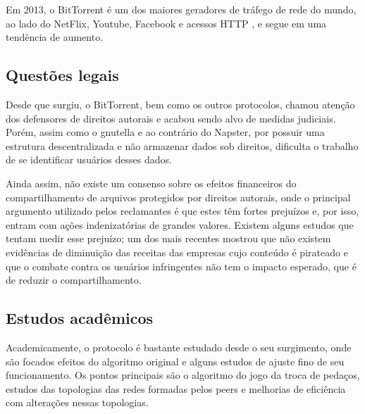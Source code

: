 Em 2013, o BitTorrent é um dos maiores geradores de tráfego de rede do mundo, ao lado
do NetFlix, Youtube, Facebook e acessos HTTP \cite{report:internet-usage-2013}, e segue
em uma tendência de aumento.

\subsection{Questões legais}

Desde que surgiu, o BitTorrent, bem como os outros protocolos, chamou atenção dos
defensores de direitos autorais e acabou sendo alvo de medidas judiciais. Porém, assim
como o \gls*{gnutella} e ao contrário do Napster, por possuir uma estrutura
descentralizada e não armazenar dados sob direitos, dificulta o trabalho de se
identificar usuários desses dados.

Ainda assim, não existe um consenso sobre os efeitos financeiros do compartilhamento de
arquivos protegidos por direitos autorais, onde o principal argumento utilizado pelos
reclamantes é que estes têm fortes prejuízos e, por isso, entram com ações
indenizatórias de grandes valores. Existem alguns estudos que tentam medir esse
prejuízo; um dos mais recentes \cite{report:lse-piracy} mostrou que não existem
evidências de diminuição das receitas das empresas cujo conteúdo é pirateado e que o
combate contra os usuários infringentes não tem o impacto esperado, que é de reduzir o
compartilhamento.

\subsection{Estudos acadêmicos}


Academicamente, o protocolo é bastante estudado desde o seu surgimento, onde são
focados efeitos do algoritmo original e alguns estudos de ajuste fino de seu
funcionamento. Os pontos principais são o algoritmo do jogo da troca de pedaços,
estudos das topologias das redes formadas pelos \glspl*{peer} e melhorias de eficiência
com alterações nessas topologias.

\afterpage{\clearpage}